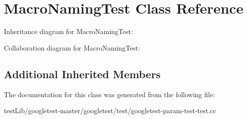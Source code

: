 \hypertarget{classMacroNamingTest}{}\section{Macro\+Naming\+Test Class Reference}
\label{classMacroNamingTest}


Inheritance diagram for Macro\+Naming\+Test\+:


Collaboration diagram for Macro\+Naming\+Test\+:
\subsection*{Additional Inherited Members}


The documentation for this class was generated from the following file\+:\begin{DoxyCompactItemize}
\item 
test\+Lib/googletest-\/master/googletest/test/googletest-\/param-\/test-\/test.\+cc\end{DoxyCompactItemize}
